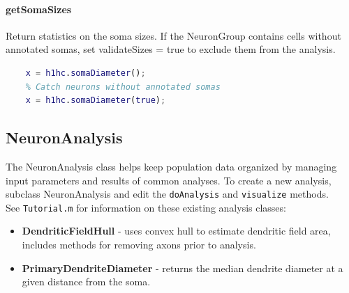 \documentclass[12pt]{exam}
\begin{document}
	\paragraph{getSomaSizes} Return statistics on the soma sizes. If the NeuronGroup contains cells without annotated somas, set validateSizes = true to exclude them from the analysis.
	\begin{lstlisting}[language=matlab]
	% output = NeuronGroup.somaDiameter(validateSizes);
	x = h1hc.somaDiameter();
	% Catch neurons without annotated somas
	x = h1hc.somaDiameter(true);
	\end{lstlisting}
	
	\subsection{NeuronAnalysis}
	The NeuronAnalysis class helps keep population data organized by managing input parameters and results of common analyses. To create a new analysis, subclass NeuronAnalysis and edit the \texttt{doAnalysis} and \texttt{visualize} methods.\\
	See \texttt{Tutorial.m} for information on these existing analysis classes:
	\begin{itemize}
		\item \textbf{DendriticFieldHull} - uses convex hull to estimate dendritic field area, includes methods for removing axons prior to analysis.
		\item \textbf{PrimaryDendriteDiameter} - returns the median dendrite diameter at a given distance from the soma.
	\end{itemize}
\end{document}
